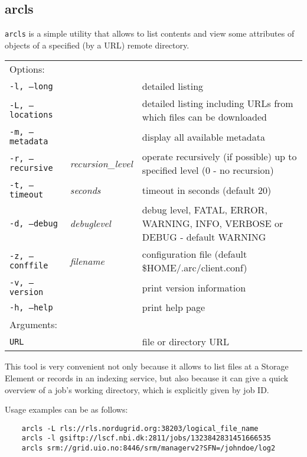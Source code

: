 \subsection{arcls}\label{sec:arcls}
\texttt{arcls} is a simple
utility that allows to list contents and view some attributes of
objects of a specified (by a URL) remote directory.

\hspace*{0.5cm}
\begin{shaded}
\end{shaded}
\begin{longtable}{llp{8cm}}
    Options:&&\\
   \texttt{-l, --long} &  & detailed listing\\
   \texttt{-L, --locations} &  & detailed listing including URLs from which files can be downloaded\\
   \texttt{-m, --metadata} && display all available metadata\\
   \texttt{-r, --recursive} & \textit{recursion\_level} & operate recursively (if possible) up to specified level (0 - no recursion)\\
   \texttt{-t, --timeout}&\textit{seconds}&timeout in seconds (default 20)\\
   \texttt{-d, --debug}&\textit{debuglevel}&debug level, FATAL, ERROR, WARNING, INFO, VERBOSE or DEBUG - default WARNING\\
   \texttt{-z, --conffile}&\textit{filename}& configuration file (default {\$}HOME/.arc/client.conf)\\
   \texttt{-v, --version}&&print version information\\
   \texttt{-h, --help}&&print help page\\
    Arguments:&&\\
    \texttt{URL} && file or directory URL\\
\end{longtable}

This tool is very convenient not only because it allows to list files
at a Storage Element or records in an indexing service, but also
because it can give a quick overview of a job's working directory,
which is explicitly given by job ID.

Usage examples can be as follows:

\begin{verbatim}
    arcls -L rls://rls.nordugrid.org:38203/logical_file_name
    arcls -l gsiftp://lscf.nbi.dk:2811/jobs/1323842831451666535
    arcls srm://grid.uio.no:8446/srm/managerv2?SFN=/johndoe/log2
\end{verbatim}

